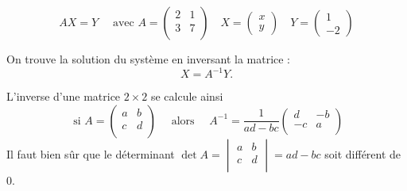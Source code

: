 {\begin{enumerate}
{$$AX=Y \quad \text{  avec } A = \begin{pmatrix} 2 & 1 \\ 3 & 7 \\ \end{pmatrix}
\quad X = \begin{pmatrix} x \\ y \end{pmatrix} \quad Y = \begin{pmatrix} 1 \\ -2 \end{pmatrix}$$

On trouve la solution du système en inversant la matrice :
$$X = A^{-1} Y.$$

L'inverse d'une matrice $2\times 2$ se calcule ainsi
$$\text{ si } A = \begin{pmatrix} a & b \\ c & d \\ \end{pmatrix} \quad \text{ alors } \quad
A^{-1} = \frac{1}{ad-bc}\begin{pmatrix} d & -b \\ -c & a \\ \end{pmatrix}$$
Il faut bien sûr que le déterminant $\det A = \begin{vmatrix}  a & b \\ c & d \\ \end{vmatrix}=ad-bc$ 
soit différent de $0$.

}
\end{enumerate}}
